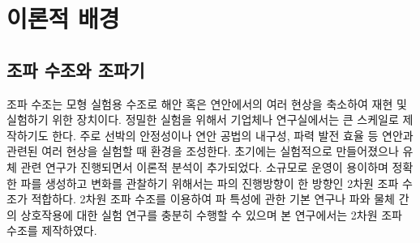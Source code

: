 \section{이론적 배경}

\subsection{조파 수조와 조파기}
조파 수조는 모형 실험용 수조로 해안 혹은 연안에서의 여러 현상을 축소하여 재현 및 실험하기 위한 장치이다. 정밀한 실험을 위해서 기업체나 연구실에서는 큰 스케일로 제작하기도 한다. 주로 선박의 안정성이나 연안 공법의 내구성, 파력 발전 효율 등 연안과 관련된 여러 현상을 실험할 때 환경을 조성한다. 초기에는 실험적으로 만들어졌으나 유체 관련 연구가 진행되면서 이론적 분석이 추가되었다. 소규모로 운영이 용이하며 정확한 파를 생성하고 변화를 관찰하기 위해서는 파의 진행방향이 한 방향인 2차원 조파 수조가 적합하다. 2차원 조파 수조를 이용하여 파 특성에 관한 기본 연구나 파와 물체 간의 상호작용에 대한 실험 연구를 충분히 수행할 수 있으며 본 연구에서는 2차원 조파 수조를 제작하였다.

